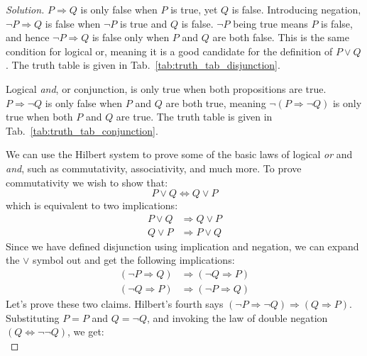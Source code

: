 \documentclass{article}
\theoremstyle{normal}
\begin{document}
    \begin{proof}[Solution]
        $P\Rightarrow{Q}$ is only false when $P$ is true, yet $Q$ is false.
        Introducing negation, $\neg{P}\Rightarrow{Q}$ is false when
        $\neg{P}$ is true and $Q$ is false. $\neg{P}$ being true means $P$ is
        false, and hence $\neg{P}\Rightarrow{Q}$ is false only when $P$ and $Q$
        are both false. This is the same condition for logical or, meaning it is
        a good candidate for the definition of $P\lor{Q}$. The truth table is
        given in Tab.~\ref{tab:truth_tab_disjunction}.
        \par\hfill\par
        Logical \textit{and}, or conjunction, is only true when both
        propositions are true. $P\Rightarrow\neg{Q}$ is only false when $P$
        and $Q$ are both true, meaning $\neg(P\Rightarrow\neg{Q})$ is only
        true when both $P$ and $Q$ are true. The truth table is given in
        Tab.~\ref{tab:truth_tab_conjunction}.
        \par\hfill\par
        We can use the Hilbert system to prove some of the basic laws of logical
        \textit{or} and \textit{and}, such as commutativity, associativity, and
        much more. To prove commutativity we wish to show that:
        \begin{equation}
            P\lor{Q}\Leftrightarrow{Q}\lor{P}
        \end{equation}
        which is equivalent to two implications:
        \begin{align}
            P\lor{Q}&\Rightarrow{Q}\lor{P}\\
            Q\lor{P}&\Rightarrow{P}\lor{Q}
        \end{align}
        Since we have defined disjunction using implication and negation, we
        can expand the $\lor$ symbol out and get the following implications:
        \begin{align}
            (\neg{P}\Rightarrow{Q})&\Rightarrow(\neg{Q}\Rightarrow{P})\\
            (\neg{Q}\Rightarrow{P})&\Rightarrow(\neg{P}\Rightarrow{Q})
        \end{align}
        Let's prove these two claims. Hilbert's fourth says
        $(\neg{P}\Rightarrow\neg{Q})\Rightarrow(Q\Rightarrow{P})$. Substituting
        $P=P$ and $Q=\neg{Q}$, and invoking the law of double negation
        $(Q\Leftrightarrow\neg\neg{Q})$, we get:
        \begin{equation}

\end{equation}
\end{proof}
\end{document}

